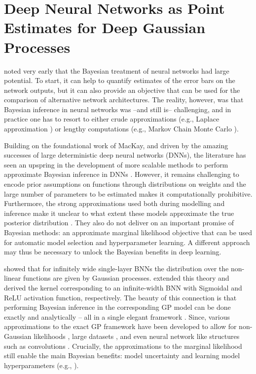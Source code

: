 \chapter{Deep Neural Networks as Point Estimates for Deep Gaussian Processes}

\citet{mackay1992practical,mackay1992bmc} noted very early that the Bayesian treatment of neural networks had large potential. To start, it can help to quantify estimates of the error bars on the network outputs, but it can also provide an objective that can be used for the comparison of alternative network architectures. The reality, however, was that Bayesian inference in neural networks was --and still is-- challenging, and in practice one has to resort to either crude approximations (e.g., Laplace approximation \citep{MacKay1998laplace}) or lengthy computations (e.g., Markov Chain Monte Carlo \citep{neal1992bayesian}).

Building on the foundational work of MacKay, and driven by the amazing successes of large deterministic deep neural networks (DNNs), the literature has seen an upspring in the development of more scalable methods to perform approximate Bayesian inference in DNNs \citep{blundell2015,Kingma2015local,Gal2016dropout}. However, it remains challenging to encode prior assumptions on functions through distributions on weights and the large number of parameters to be estimated makes it computationally prohibitive. Furthermore, the strong approximations used both during modelling and inference make it unclear to what extent these models approximate the true posterior distribution \citep{hron2017variational, foong2019expressiveness}. They also do not deliver on an important promise of Bayesian methods: an approximate marginal likelihood objective that can be used for automatic model selection and hyperparameter learning. A different approach may thus be necessary to unlock the Bayesian benefits in deep learning.

\citet{neal1996bayesian} showed that for infinitely wide single-layer BNNs the distribution over the non-linear functions are given by Gaussian processes. \citet{williams1998computation,cho2009kernel} extended this theory and derived the kernel corresponding to an infinite-width BNN with Sigmoidal and ReLU activation function, respectively. The beauty of this connection is that performing Bayesian inference in the corresponding GP model can be done exactly and analytically -- all in a single elegant framework \citep{rasmussen2006}. Since, various approximations to the exact GP framework have been developed to allow for non-Gaussian likelihoods \citep{kuss2005assessing,hensman2013}, large datasets \citep{hensman2015scalable, wang2019exact}, and even neural network like structures such as convolutions \citep{vanderwilk2017conv}. Crucially, the approximations to the marginal likelihood still enable the main Bayesian benefits: model uncertainty and learning model hyperparameters (e.g., \citep{vanderwilk2018invariances,Dutordoir2020convolutional}).

